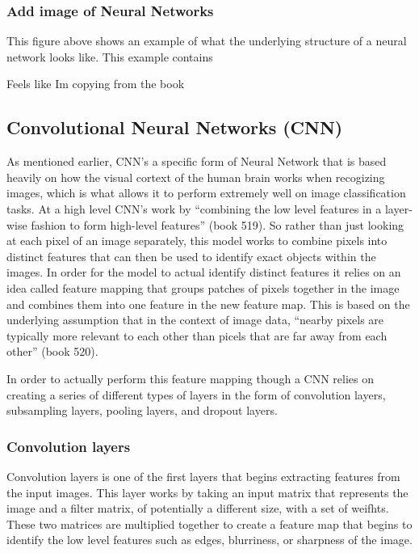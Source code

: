 \documentclass[12pt]{article}
\begin{document}
\hypertarget{add-image-of-neural-networks}{%
\subsubsection{Add image of Neural
Networks}\label{add-image-of-neural-networks}}

This figure above shows an example of what the underlying structure of a
neural network looks like. This example contains

Feels like Im copying from the book

\hypertarget{convolutional-neural-networks-cnn}{%
\subsection{Convolutional Neural Networks
(CNN)}\label{convolutional-neural-networks-cnn}}

As mentioned earlier, CNN's a specific form of Neural Network that is
based heavily on how the visual cortext of the human brain works when
recogizing images, which is what allows it to perform extremely well on
image classification tasks. At a high level CNN's work by ``combining
the low level features in a layer-wise fashion to form high-level
features'' (book 519). So rather than just looking at each pixel of an
image separately, this model works to combine pixels into distinct
features that can then be used to identify exact objects within the
images. In order for the model to actual identify distinct features it
relies on an idea called feature mapping that groups patches of pixels
together in the image and combines them into one feature in the new
feature map. This is based on the underlying assumption that in the
context of image data, ``nearby pixels are typically more relevant to
each other than picels that are far away from each other'' (book 520).

In order to actually perform this feature mapping though a CNN relies on
creating a series of different types of layers in the form of
convolution layers, subsampling layers, pooling layers, and dropout
layers.

\hypertarget{convolution-layers}{%
\subsubsection{Convolution layers}\label{convolution-layers}}

Convolution layers is one of the first layers that begins extracting
features from the input images. This layer works by taking an input
matrix that represents the image and a filter matrix, of potentially a
different size, with a set of weifhts. These two matrices are multiplied
together to create a feature map that begins to identify the low level
features such as edges, blurriness, or sharpness of the image.
\end{document}
